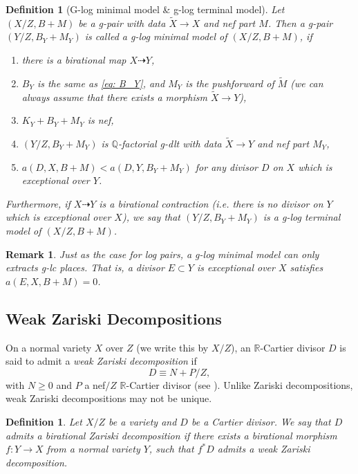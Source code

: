 \documentclass[11pt]{amsart}
\newcommand{\Rr}{\mathbb{R}}
\newcommand{\Qq}{\mathbb{Q}}
\newtheorem{definition}[theorem]{Definition}
\newtheorem{remark}[theorem]{Remark}
\begin{document}
\begin{definition}[G-log minimal model \& g-log terminal model]\label{def: g-log minimal model and g-log terminal model}
	Let $(X/Z, B+M)$ be a g-pair with data $\tilde X \to X$ and nef part $M$. Then a g-pair $(Y/Z, B_Y+M_Y)$ is called a \emph{g-log minimal model} of $(X/Z, B+M)$, if
	\begin{enumerate}
		\item there is a birational map $X \dashrightarrow Y$,
		\item $B_Y$ is the same as \eqref{eq: B_Y}, and $M_Y$ is the pushforward of $\tilde M$ (we can always assume that there exists a morphism $\tilde X \to Y$),
		\item $K_Y+B_Y+M_Y$ is nef, 
		\item $(Y/Z, B_Y+M_Y)$ is $\Qq$-factorial g-dlt with data $\tilde X \to Y$ and nef part $M_Y$,
		\item $a(D, X, B+M)<a(D,Y, B_Y+M_Y)$ for any divisor $D$ on $X$ which is exceptional over $Y$.
	\end{enumerate}
	Furthermore, if $X \dasharrow Y$ is a birational contraction (i.e. there is no divisor on $Y$ which is exceptional over $X$), we say that $(Y/Z, B_Y+M_Y)$ is a \emph{g-log terminal model} of $(X/Z, B+M)$.
\end{definition}

\begin{remark}\label{rmk: extract lc places}
Just as the case for log pairs, a g-log minimal model can only extracts g-lc places. That is, a divisor $E\subset Y$ is exceptional over $X$ satisfies $a(E, X, B+M)=0$. 
\end{remark}


\subsection{Weak Zariski Decompositions}\label{sec: Zariski decomposition}
On a normal variety $X$ over $Z$ (we write this by $X/Z$), an $\Rr$-Cartier divisor $D$ is said to admit a \emph{weak Zariski decomposition} if 
\[D \equiv N+P/Z,\] with $N \geq 0$ and $P$ a nef$/Z$ $\Rr$-Cartier divisor (see \cite[Definition 1.3]{Birkarweak12}). Unlike Zariski decompositions, weak Zariski decompositions may not be unique.

\begin{definition}\label{def: bir zariski decomposition}
	Let $X/Z$ be a variety and $D$ be a Cartier divisor. We say that $D$ admits a \emph{birational Zariski decomposition} if there exists a birational morphism $f: Y \to X$ from a normal variety $Y$, such that $f^*D$ admits a weak Zariski decomposition. 
\end{definition}
\end{document}
